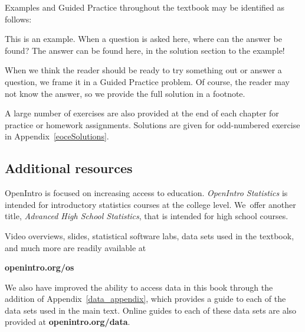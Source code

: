 \noindent%
Examples and Guided Practice throughout the textbook may be
identified as follows:

\begin{examplewrap}
\begin{nexample}{This is an example.
    When a question is asked here, where can the answer be found?}
  The answer can be found here, in the solution section
  to the example!
\end{nexample}
\end{examplewrap}

\begin{exercisewrap}
\begin{nexercise}
When we think the reader should be ready to try something out
or answer a question, we frame it in a Guided Practice problem.
Of course, the reader may not know the answer,
so we provide the full solution in a footnote.\footnotemark{}
\end{nexercise}
\end{exercisewrap}

A large number of exercises are also provided at the end
of each chapter for practice or homework assignments.
Solutions are given for odd-numbered exercise in
Appendix~\ref{eoceSolutions}.


\subsection*{Additional resources}

OpenIntro is focused on increasing access to education.
\emph{OpenIntro Statistics} is intended for introductory
statistics courses at the college level.
We~offer another title,
    {\emph{Advanced High School Statistics}},
that is intended for high school courses.

Video overviews, slides, statistical software labs,
data sets used in the textbook,
and much more are readily available at\\[-5mm]
\begin{center}
    {\color{black}\textbf{openintro.org/os}}
\end{center}
We also have improved the ability to access data in this book
through the addition of Appendix~\ref{data_appendix},
which provides a guide to each of the data sets used in the
main text.
Online guides to each of these data sets are also provided at
    {\color{black}\textbf{openintro.org/data}}.

